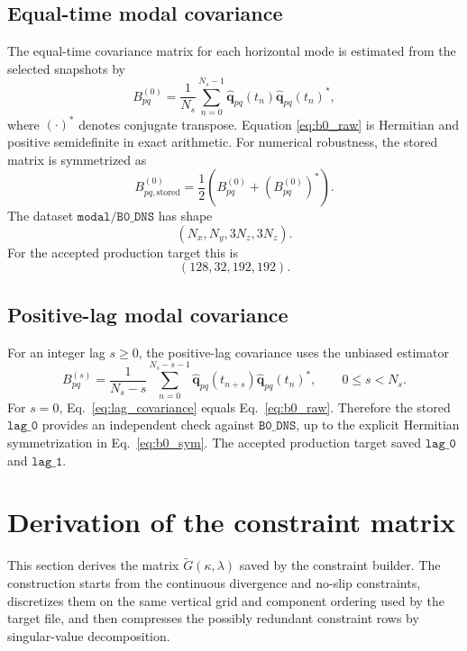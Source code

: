 \documentclass[11pt]{article}
\newcommand{\bfq}{\bm{q}}
\newcommand{\Gtilde}{\widetilde{G}}
\begin{document}
\subsection{Equal-time modal covariance}

The equal-time covariance matrix for each horizontal mode is estimated from
the selected snapshots by
\begin{equation}
  B^{(0)}_{pq}
  =
  \frac{1}{N_s}
  \sum_{n=0}^{N_s-1}
  \widehat{\bfq}_{pq}(t_n)
  \widehat{\bfq}_{pq}(t_n)^*,
  \label{eq:b0_raw}
\end{equation}
where \((\cdot)^*\) denotes conjugate transpose. Equation
\eqref{eq:b0_raw} is Hermitian and positive semidefinite in exact arithmetic.
For numerical robustness, the stored matrix is symmetrized as
\begin{equation}
  B^{(0)}_{pq,\mathrm{stored}}
  =
  \frac{1}{2}\left(B^{(0)}_{pq}+\left(B^{(0)}_{pq}\right)^*\right).
  \label{eq:b0_sym}
\end{equation}
The dataset \(\texttt{modal/B0\_DNS}\) has shape
\[
  (N_x,N_y,3N_z,3N_z).
\]
For the accepted production target this is
\[
  (128,32,192,192).
\]

\subsection{Positive-lag modal covariance}

For an integer lag \(s\ge 0\), the positive-lag covariance uses the unbiased
estimator
\begin{equation}
  B^{(s)}_{pq}
  =
  \frac{1}{N_s-s}
  \sum_{n=0}^{N_s-s-1}
  \widehat{\bfq}_{pq}(t_{n+s})
  \widehat{\bfq}_{pq}(t_n)^*,
  \qquad 0\le s<N_s.
  \label{eq:lag_covariance}
\end{equation}
For \(s=0\), Eq.~\eqref{eq:lag_covariance} equals
Eq.~\eqref{eq:b0_raw}. Therefore the stored \(\texttt{lag\_0}\) provides an
independent check against \(\texttt{B0\_DNS}\), up to the explicit Hermitian
symmetrization in Eq.~\eqref{eq:b0_sym}. The accepted production target saved
\(\texttt{lag\_0}\) and \(\texttt{lag\_1}\).

\section{Derivation of the constraint matrix}
\label{sec:constraint}

This section derives the matrix \(\Gtilde(\kappa,\lambda)\) saved by the
constraint builder. The construction starts from the continuous divergence and
no-slip constraints, discretizes them on the same vertical grid and component
ordering used by the target file, and then compresses the possibly redundant
constraint rows by singular-value decomposition.
\end{document}
